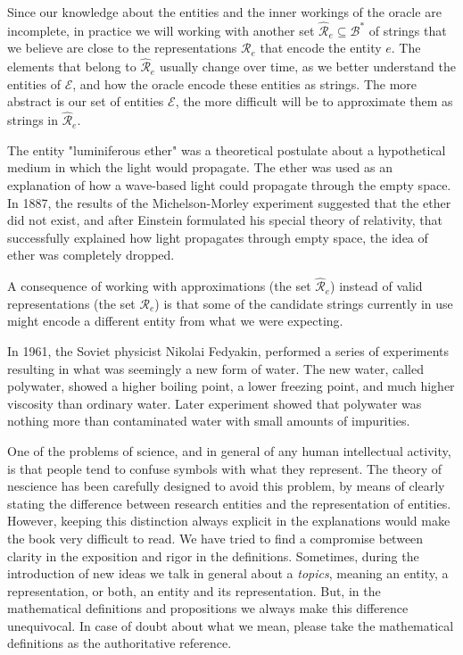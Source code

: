 Since our knowledge about the entities and the inner workings of the oracle are incomplete, in practice we will working with another set $\hat{\mathcal{R}}_e \subseteq \mathcal{B}^\ast$ of strings that we believe are close to the representations $\mathcal{R}_e$ that encode the entity $e$. The elements that belong to $\hat{\mathcal{R}}_e$ usually change over time, as we better understand the entities of $\mathcal{E}$, and how the oracle encode these entities as strings. The more abstract is our set of entities $\mathcal{E}$, the more difficult will be to approximate them as strings in $\hat{\mathcal{R}}_e$.

\begin{example}
\label{ex:luminiferous_ether}
The entity "luminiferous ether" was a theoretical postulate about a hypothetical medium in which the light would propagate. The ether was used as an explanation of how a wave-based light could propagate through the empty space. In 1887, the results of the Michelson-Morley experiment suggested that the ether did not exist, and after Einstein formulated his special theory of relativity, that successfully explained how light propagates through empty space, the idea of ether was completely dropped.
\end{example}

A consequence of working with approximations (the set $\hat{\mathcal{R}}_e$) instead of valid representations (the set $\mathcal{R}_e$) is that some of the candidate strings currently in use might encode a different entity from what we were expecting.

\begin{example}
\label{ex:polywater}
In 1961, the Soviet physicist Nikolai Fedyakin, performed a series of experiments resulting in what was seemingly a new form of water. The new water, called polywater, showed a higher boiling point, a lower freezing point, and much higher viscosity than ordinary water. Later experiment showed that polywater was nothing more than contaminated water with small amounts of impurities.
\end{example}

\begin{remark}
One of the problems of science, and in general of any human intellectual activity, is that people tend to confuse symbols with what they represent. The theory of nescience has been carefully designed to avoid this problem, by means of clearly stating the difference between research entities and the representation of entities. However, keeping this distinction always explicit in the explanations would make the book very difficult to read. We have tried to find a compromise between clarity in the exposition and rigor in the definitions. Sometimes, during the introduction of new ideas we talk in general about a \emph{topics}, meaning an entity, a representation, or both, an entity and its representation. But, in the mathematical definitions and propositions we always make this difference unequivocal. In case of doubt about what we mean, please take the mathematical definitions as the authoritative reference. 
\end{remark}

